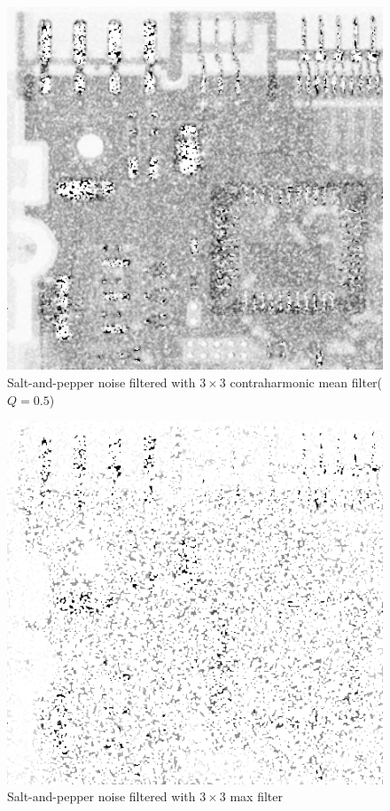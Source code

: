 \documentclass{article}
\begin{document}
\begin{figure}[H]
	\centering
	\includegraphics[width=336pt]{../result/task2/sap/sap-contraharmonic.png}
	\caption{Salt-and-pepper noise filtered with $3 \times 3$ contraharmonic mean filter($Q=0.5$)}
	\label{fig:sapchm}
\end{figure}

\begin{figure}[H]
	\centering
	\includegraphics[width=336pt]{../result/task2/sap/sap-max.png}
	\caption{Salt-and-pepper noise filtered with $3 \times 3$ max filter}
	\label{fig:sapmax}
\end{figure}
\end{document}
